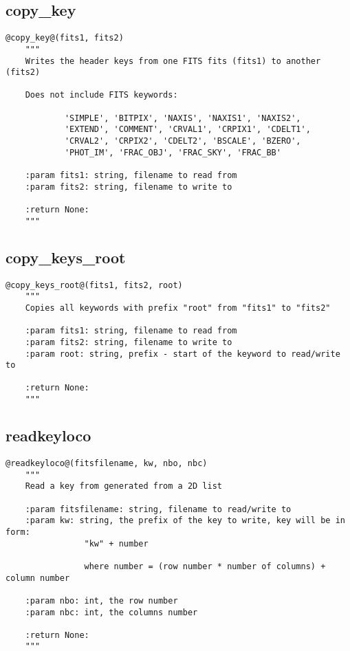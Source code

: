 \subsection{copy\_key}
\begin{lstlisting}[style=pythonstyle]
@copy_key@(fits1, fits2)
    """
    Writes the header keys from one FITS fits (fits1) to another (fits2)
    
    Does not include FITS keywords:
    
            'SIMPLE', 'BITPIX', 'NAXIS', 'NAXIS1', 'NAXIS2',
            'EXTEND', 'COMMENT', 'CRVAL1', 'CRPIX1', 'CDELT1',
            'CRVAL2', 'CRPIX2', 'CDELT2', 'BSCALE', 'BZERO',
            'PHOT_IM', 'FRAC_OBJ', 'FRAC_SKY', 'FRAC_BB'
    
    :param fits1: string, filename to read from 
    :param fits2: string, filename to write to
    
    :return None: 
    """
\end{lstlisting}

\subsection{copy\_keys\_root}
\begin{lstlisting}[style=pythonstyle]
@copy_keys_root@(fits1, fits2, root)
    """
    Copies all keywords with prefix "root" from "fits1" to "fits2"
    
    :param fits1: string, filename to read from
    :param fits2: string, filename to write to
    :param root: string, prefix - start of the keyword to read/write to
    
    :return None: 
    """
\end{lstlisting}

\subsection{readkeyloco}
\begin{lstlisting}[style=pythonstyle]
@readkeyloco@(fitsfilename, kw, nbo, nbc)
    """
    Read a key from generated from a 2D list

    :param fitsfilename: string, filename to read/write to
    :param kw: string, the prefix of the key to write, key will be in form:
                "kw" + number
                
                where number = (row number * number of columns) + column number
                
    :param nbo: int, the row number
    :param nbc: int, the columns number
    
    :return None:
    """
\end{lstlisting}

